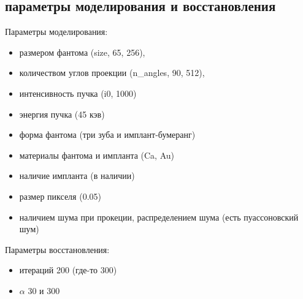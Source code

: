 \subsection{параметры моделирования и восстановления} \label{sect_2_3}
Параметры моделирования:
\begin{itemize}
  \item размером фантома (size, 65, 256),
  \item количеством углов проекции (n\_angles, 90, 512), 
  \item интенсивность пучка (i0, 1000)
  \item энергия пучка (45 кэв)
  \item форма фантома (три зуба и имплант-бумеранг)
  \item материалы фантома и импланта (Ca, Au)
  \item наличие импланта (в наличии)
  \item размер пикселя (0.05)
  \item наличием шума при прокеции, распределением шума (есть пуассоновский шум)
\end{itemize}

Параметры восстановления:
\begin{itemize}
  \item итераций 200 (где-то 300)
  \item $\alpha$ 30 и 300
\end{itemize}

